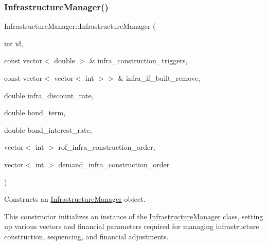 \subsubsection{\texorpdfstring{Infrastructure\+Manager()}{InfrastructureManager()}\hspace{0.1cm}{\footnotesize\ttfamily [1/3]}}
{\footnotesize\ttfamily Infrastructure\+Manager\+::\+Infrastructure\+Manager (\begin{DoxyParamCaption}\item[{int}]{id,  }\item[{const vector$<$ double $>$ \&}]{infra\+\_\+construction\+\_\+triggers,  }\item[{const vector$<$ vector$<$ int $>$$>$ \&}]{infra\+\_\+if\+\_\+built\+\_\+remove,  }\item[{double}]{infra\+\_\+discount\+\_\+rate,  }\item[{double}]{bond\+\_\+term,  }\item[{double}]{bond\+\_\+interest\+\_\+rate,  }\item[{vector$<$ int $>$}]{rof\+\_\+infra\+\_\+construction\+\_\+order,  }\item[{vector$<$ int $>$}]{demand\+\_\+infra\+\_\+construction\+\_\+order }\end{DoxyParamCaption})}



Constructs an \mbox{\hyperlink{classInfrastructureManager}{Infrastructure\+Manager}} object. 

This constructor initializes an instance of the {\ttfamily \mbox{\hyperlink{classInfrastructureManager}{Infrastructure\+Manager}}} class, setting up various vectors and financial parameters required for managing infrastructure construction, sequencing, and financial adjustments.


